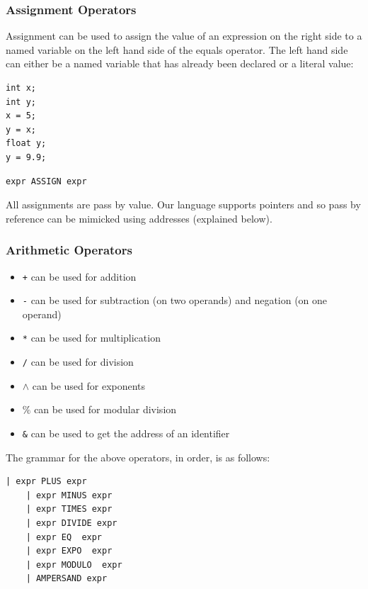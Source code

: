 \documentclass{article}
\begin{document}
\subsubsection{Assignment Operators}
Assignment can be used to assign the value of an expression on the right side to a named variable on the left hand side of the equals operator.  The left hand side can either be a named variable that has already been declared or a literal value:
\begin{lstlisting}
int x;
int y;
x = 5;
y = x;
float y;
y = 9.9;
\end{lstlisting}

\begin{Verbatim}[frame=single]
 expr ASSIGN expr 
\end{Verbatim}

All assignments are pass by value. Our language supports pointers and so pass by reference can be mimicked using addresses (explained below).

\subsubsection{Arithmetic Operators}
\begin{itemize}
\item \texttt{+} can be used for addition
\item \texttt{-} can be used for subtraction (on two operands) and negation (on one operand)
\item \texttt{*} can be used for multiplication
\item \texttt{/} can be used for division
\item \texttt{$\wedge$} can be used for exponents
\item \texttt{$\%$} can be used for modular division
\item \texttt{\&} can be used to get the address of an identifier
\end{itemize}



The grammar for the above operators, in order, is as follows:
\begin{Verbatim}[frame=single]
	| expr PLUS expr 	
	| expr MINUS expr 	
	| expr TIMES expr 
	| expr DIVIDE expr 
	| expr EQ  expr 
	| expr EXPO  expr 
	| expr MODULO  expr 
	| AMPERSAND expr
\end{Verbatim}
\end{document}
